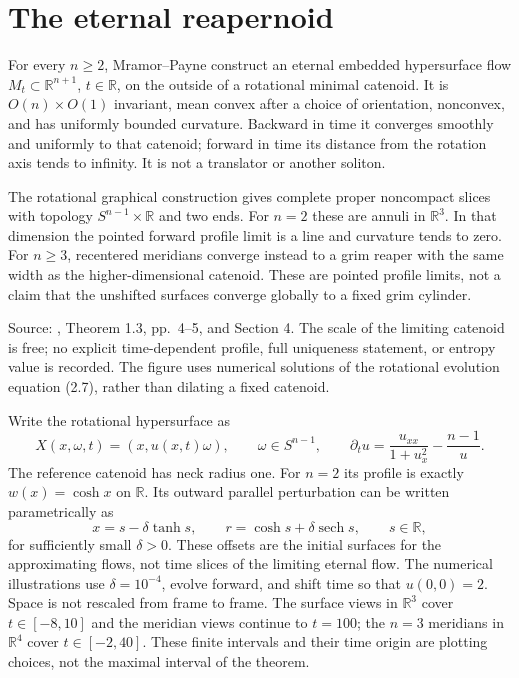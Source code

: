 \chapter{The eternal reapernoid}\label{sec:catalogue-reapernoid}
\begin{example}\label{ex:catalogue-reapernoid}
For every $n\geq2$, Mramor--Payne construct an eternal embedded hypersurface flow $M_t\subset\mathbb R^{n+1}$, $t\in\mathbb R$, on the outside of a rotational minimal catenoid. It is $O(n)\times O(1)$ invariant, mean convex after a choice of orientation, nonconvex, and has uniformly bounded curvature. Backward in time it converges smoothly and uniformly to that catenoid; forward in time its distance from the rotation axis tends to infinity. It is not a translator or another soliton.

The rotational graphical construction gives complete proper noncompact slices with topology $S^{n-1}\times\mathbb R$ and two ends. For $n=2$ these are annuli in $\mathbb R^3$. In that dimension the pointed forward profile limit is a line and curvature tends to zero. For $n\geq3$, recentered meridians converge instead to a grim reaper with the same width as the higher-dimensional catenoid. These are pointed profile limits, not a claim that the unshifted surfaces converge globally to a fixed grim cylinder.

Source: \cite{CatMP19}, Theorem 1.3, pp.~4--5, and Section 4. The scale of the limiting catenoid is free; no explicit time-dependent profile, full uniqueness statement, or entropy value is recorded. The figure uses numerical solutions of the rotational evolution equation (2.7), rather than dilating a fixed catenoid.

Write the rotational hypersurface as
\[
 X(x,\omega,t)=(x,u(x,t)\omega),\qquad \omega\in S^{n-1},\qquad
 \partial_tu=\frac{u_{xx}}{1+u_x^2}-\frac{n-1}{u}.
\]
The reference catenoid has neck radius one. For $n=2$ its profile is exactly $w(x)=\cosh x$ on $\mathbb R$. Its outward parallel perturbation can be written parametrically as
\[
 x=s-\delta\tanh s,\qquad r=\cosh s+\delta\operatorname{sech}s,
 \qquad s\in\mathbb R,
\]
for sufficiently small $\delta>0$. These offsets are the initial surfaces for the approximating flows, not time slices of the limiting eternal flow. The numerical illustrations use $\delta=10^{-4}$, evolve forward, and shift time so that $u(0,0)=2$. Space is not rescaled from frame to frame. The surface views in $\mathbb R^3$ cover $t\in[-8,10]$ and the meridian views continue to $t=100$; the $n=3$ meridians in $\mathbb R^4$ cover $t\in[-2,40]$. These finite intervals and their time origin are plotting choices, not the maximal interval of the theorem.


\end{example}
